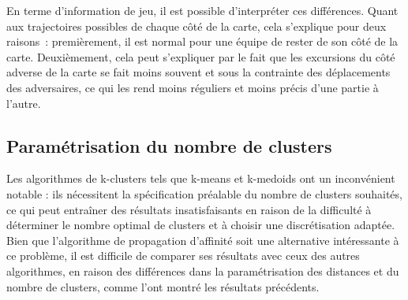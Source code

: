 
En terme d'information de jeu, il est possible d'interpréter ces différences. Quant aux trajectoires possibles de chaque côté de la carte, cela s'explique pour deux raisons~: premièrement, il est normal pour une équipe de rester de son côté de la carte. Deuxièmement, cela peut s'expliquer par le fait que les excursions du côté adverse de la carte se fait moins souvent et sous la contrainte des déplacements des adversaires, ce qui les rend moins réguliers et moins précis d'une partie à l'autre. 


\subsection{Paramétrisation du nombre de clusters}

Les algorithmes de k-clusters tels que k-means et k-medoids ont un inconvénient notable : ils nécessitent la spécification préalable du nombre de clusters souhaités, ce qui peut entraîner des résultats insatisfaisants en raison de la difficulté à déterminer le nombre optimal de clusters et à choisir une discrétisation adaptée. Bien que l'algorithme de propagation d'affinité soit une alternative intéressante à ce problème, il est difficile de comparer ses résultats avec ceux des autres algorithmes, en raison des différences dans la paramétrisation des distances et du nombre de clusters, comme l'ont montré les résultats précédents.




